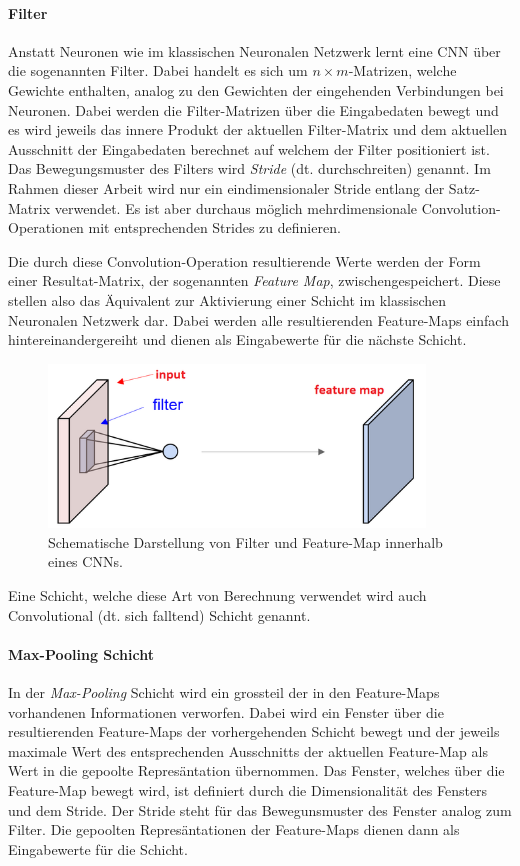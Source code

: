 \paragraph{Filter}\label{basic:cnn:filter} Anstatt Neuronen wie im klassischen Neuronalen Netzwerk lernt eine CNN über die sogenannten Filter. Dabei handelt es sich um $n\times m$-Matrizen, welche Gewichte enthalten, analog zu den Gewichten der eingehenden Verbindungen bei Neuronen. Dabei werden die Filter-Matrizen über die Eingabedaten bewegt und es wird jeweils das innere Produkt der aktuellen Filter-Matrix und dem aktuellen Ausschnitt der Eingabedaten berechnet auf welchem der Filter positioniert ist. Das Bewegungsmuster des Filters wird \emph{Stride} (dt. durchschreiten) genannt. Im Rahmen dieser Arbeit wird nur ein eindimensionaler Stride entlang der Satz-Matrix verwendet. Es ist aber durchaus möglich mehrdimensionale Convolution-Operationen mit entsprechenden Strides zu definieren.

Die durch diese Convolution-Operation resultierende Werte werden der Form einer Resultat-Matrix, der sogenannten \emph{Feature Map}, zwischengespeichert. Diese stellen also das Äquivalent zur Aktivierung einer Schicht im klassischen Neuronalen Netzwerk dar. Dabei werden alle resultierenden Feature-Maps einfach hintereinandergereiht und dienen als Eingabewerte für die nächste Schicht. 

\begin{figure}[h]
	\centering
	\includegraphics[width=10cm]{img/filter_feature_map}
	\caption{Schematische Darstellung von Filter und Feature-Map innerhalb eines CNNs.}
\end{figure}

Eine Schicht, welche diese Art von Berechnung verwendet wird auch Convolutional (dt. sich falltend) Schicht genannt.

\paragraph{Max-Pooling Schicht} In der \emph{Max-Pooling} Schicht wird ein grossteil der in den Feature-Maps vorhandenen Informationen verworfen. Dabei wird ein Fenster über die resultierenden Feature-Maps der vorhergehenden Schicht bewegt und der jeweils maximale Wert des entsprechenden Ausschnitts der aktuellen Feature-Map als Wert in die gepoolte Represäntation übernommen. Das Fenster, welches über die Feature-Map bewegt wird, ist definiert durch die Dimensionalität des Fensters und dem Stride. Der Stride steht für das Bewegunsmuster des Fenster analog zum Filter. Die gepoolten Represäntationen der Feature-Maps dienen dann als Eingabewerte für die Schicht.

